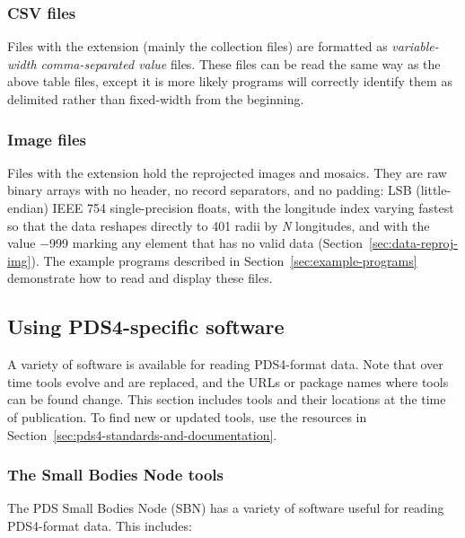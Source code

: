 \subsubsection{CSV files}
\label{sec:csv-files}

Files with the extension  (mainly the collection files) are formatted as \textit{variable-width comma-separated value} files. These files can be read the same way as the above table files, except it is more likely programs will correctly identify them as delimited rather than fixed-width from the beginning.


\subsubsection{Image files}
\label{sec:image-files}

Files with the extension  hold the reprojected images and mosaics. They are raw binary arrays with no header, no record separators, and no padding: LSB (little-endian) IEEE 754 single-precision floats, with the longitude index varying fastest so that the data reshapes directly to 401 radii by \textit{N} longitudes, and with the value −999 marking any element that has no valid data (Section~\ref{sec:data-reproj-img}).
The example programs described in Section~\ref{sec:example-programs} demonstrate how to read and display these files.


\subsection{Using PDS4-specific software}
\label{sec:using-pds4-specific-software}

A variety of software is available for reading PDS4-format data. Note that over time tools evolve and are replaced, and the URLs or package names where tools can be found change. This section includes tools and their locations at the time of publication. To find new or updated tools, use the resources in Section~\ref{sec:pds4-standards-and-documentation}.


\subsubsection{The Small Bodies Node tools}
\label{sec:the-small-bodies-node-tools}

The PDS Small Bodies Node (SBN) has a variety of software useful for reading PDS4-format data. This includes:

